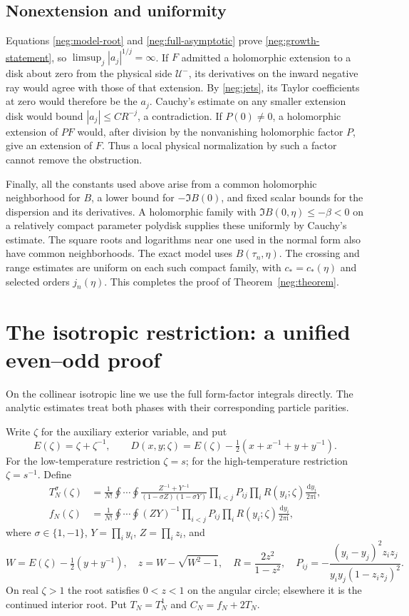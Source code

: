 \documentclass[11pt]{article}
\numberwithin{equation}{section}
\theoremstyle{definition}
\newcommand{\ii}{\mathrm i}
\newcommand{\dd}{\,\mathrm d}
\begin{document}
\subsection{Nonextension and uniformity}
\label{neg:conclusion}

Equations \eqref{neg:model-root} and
\eqref{neg:full-asymptotic} prove
\eqref{neg:growth-statement}, so
\(\limsup_j|a_j|^{1/j}=\infty\).
If \(F\) admitted a holomorphic extension to a disk about
zero from the physical side \(\mathcal U^-\), its derivatives
on the inward negative ray would agree with those of that
extension.  By \eqref{neg:jets}, its Taylor coefficients at
zero would therefore be the \(a_j\).  Cauchy's estimate on
any smaller extension disk would bound
\(|a_j|\le C R^{-j}\), a contradiction.
If \(P(0)\ne0\), a holomorphic extension of \(PF\) would,
after division by the nonvanishing holomorphic factor
\(P\), give an extension of \(F\).  Thus a local physical
normalization by such a factor cannot remove the obstruction.

Finally, all the constants used above arise from a common
holomorphic neighborhood for \(B\), a lower bound for
\(-\Im B(0)\), and fixed scalar bounds for the dispersion
and its derivatives.  A holomorphic family with
\(\Im B(0,\eta)\le-\beta<0\) on a relatively compact
parameter polydisk supplies these uniformly by Cauchy's
estimate.  The square roots and logarithms near one used
in the normal form also have common neighborhoods.
The exact model uses \(B(\tau_n,\eta)\). The crossing and range
estimates are uniform on each such compact family, with
\(c_*=c_*(\eta)\) and selected orders \(j_n(\eta)\).
This completes the proof of Theorem~\ref{neg:theorem}.


\section{The isotropic restriction: a unified even--odd proof}
\label{iso:section}

On the collinear isotropic line we use the full form-factor
integrals directly. The analytic estimates treat both phases
with their corresponding particle parities.

Write $\zeta$ for the auxiliary exterior variable, and put
\[
 E(\zeta)=\zeta+\zeta^{-1},\qquad
 D(x,y;\zeta)=E(\zeta)-\tfrac12(x+x^{-1}+y+y^{-1}).
\]
For the low-temperature restriction $\zeta=s$; for the high-temperature
restriction \(\zeta=s^{-1}\). Define
\begin{align}
 T_N^\sigma(\zeta)
 &=\frac1{N!}\oint\cdots\oint
 \frac{Z^{-1}+Y^{-1}}{(1-\sigma Z)(1-\sigma Y)}
 \prod_{i<j}P_{ij}\prod_i R(y_i;\zeta)\frac{\dd y_i}{2\pi\ii},
 \label{iso:reduced}\\
 f_N(\zeta)
 &=\frac1{N!}\oint\cdots\oint
 (ZY)^{-1}\prod_{i<j}P_{ij}\prod_iR(y_i;\zeta)\frac{\dd y_i}{2\pi\ii},
 \label{iso:onsite}
\end{align}
where $\sigma\in\{1,-1\}$, $Y=\prod_i y_i$, $Z=\prod_i z_i$, and
\[
 W=E(\zeta)-\tfrac12(y+y^{-1}),\quad
 z=W-\sqrt{W^2-1},\quad R=\frac{2z^2}{1-z^2},\quad
 P_{ij}=-\frac{(y_i-y_j)^2z_i z_j}{y_i y_j(1-z_i z_j)^2}.
\]
On real $\zeta>1$ the root satisfies $0<z<1$ on the angular circle;
elsewhere it is the continued interior root. Put $T_N=T_N^1$ and
$C_N=f_N+2T_N$.
\end{document}
